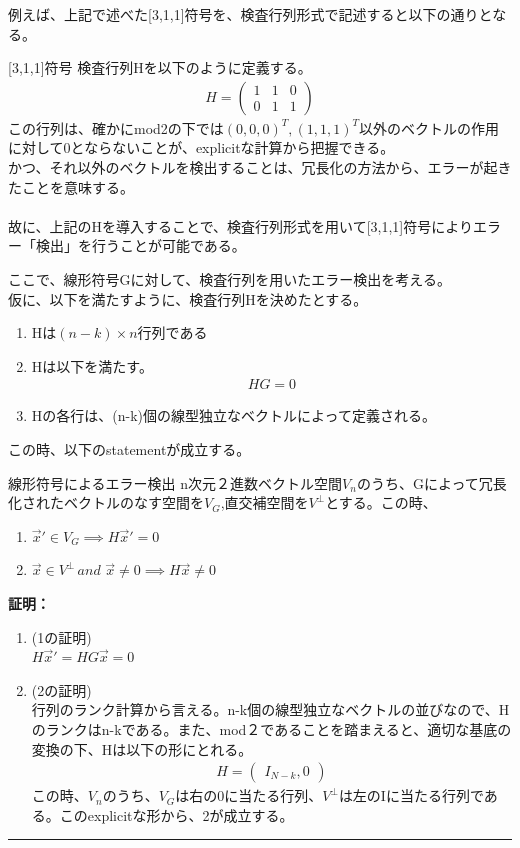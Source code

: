 \documentclass[a4paper,10.5pt]{article}
\numberwithin{equation}{section}
\newenvironment{proofbox}
{\begin{prooflabel}\textbf{証明：}\end{prooflabel}\vspace{0.8em}}
{\par\vspace{1em}\hrule\vspace{1em}}
\begin{document}
例えば、上記で述べた[3,1,1]符号を、検査行列形式で記述すると以下の通りとなる。
\begin{examplebox}{[3,1,1]符号}
    検査行列Hを以下のように定義する。
    \begin{align*}
        H=\begin{pmatrix}
         1 & 1& 0\\0&1& 1 
        \end{pmatrix}
    \end{align*}
    この行列は、確かにmod2の下では$(0,0,0)^{T},(1,1,1)^{T}$以外のベクトルの作用に対して0とならないことが、explicitな計算から把握できる。\\
    かつ、それ以外のベクトルを検出することは、冗長化の方法から、エラーが起きたことを意味する。\\
    \\
    故に、上記のHを導入することで、検査行列形式を用いて[3,1,1]符号によりエラー「検出」を行うことが可能である。
\end{examplebox}
ここで、線形符号Gに対して、検査行列を用いたエラー検出を考える。\\
仮に、以下を満たすように、検査行列Hを決めたとする。
\begin{enumerate}
    \item Hは$(n-k)\times n$行列である
    \item Hは以下を満たす。
    \begin{align*}
    HG=0
    \end{align*}
    \item Hの各行は、(n-k)個の線型独立なベクトルによって定義される。
\end{enumerate}
この時、以下のstatementが成立する。
\begin{resultbox}{線形符号によるエラー検出}
    n次元２進数ベクトル空間$V_{n}$のうち、Gによって冗長化されたベクトルのなす空間を$V_{G}$,直交補空間を$V^{\perp}$とする。この時、
    \begin{enumerate}
        \item $\vec{x}'\in V_{G} \implies H\vec{x}'=0$
        \item $\vec{x}\in V^{\perp}\, and\, \,\vec{x}\neq0 \implies H\vec{x}\neq0$
    \end{enumerate}
\end{resultbox}
\begin{proofbox}
\begin{enumerate}
    \item (1の証明)\\
    $H\vec{x}'=HG\vec{x}=0$\\
    \item (2の証明)\\
    行列のランク計算から言える。n-k個の線型独立なベクトルの並びなので、Hのランクはn-kである。また、mod２であることを踏まえると、適切な基底の変換の下、Hは以下の形にとれる。
    \begin{align*}
        H=\begin{pmatrix}
         I_{N-k},0
        \end{pmatrix}
    \end{align*}
    この時、$V_{n}$のうち、$V_{G}$は右の0に当たる行列、$V^{\perp}$は左のIに当たる行列である。このexplicitな形から、2が成立する。
\end{enumerate}
\end{proofbox}
\end{document}
